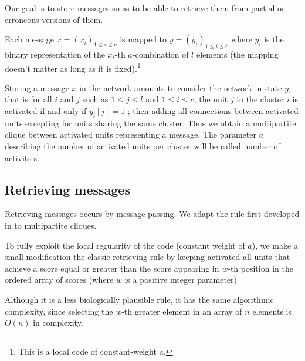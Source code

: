 \documentclass[english,11pt,twocolumn]{article}
\renewcommand{\le}{\leqslant}
\theoremstyle{definition}
\begin{document}
	Our goal is to store messages so as to be able to retrieve them from partial or erroneous versions of them.
	
	Each message $x = (x_i)_{1 \le i \le c}$ is mapped to $y = (y_i)_{1 \le i \le c}$ where $y_i$ is the binary representation of the $x_i$-th $a$-combination of $l$ elements (the mapping doesn't matter as long as it is fixed).\footnote{This is a local code of constant-weight $a$.}
	
	Storing a message $x$ in the network amounts to consider the network in state $y$, that is for all $i$ and $j$ such as $1 \le j \le l$ and $1 \le i \le c$, the unit $j$ in the cluster $i$ is activated if and only if $y_i[j] = 1$ ; then adding all connections between activated units excepting for units sharing the same cluster. Thus we obtain a multipartite clique between activated units representing a message. The parameter $a$ describing the number of activated units per cluster will be called number of activities.
		
	\subsection{Retrieving messages}	
		
		Retrieving messages occurs by message passing. We adapt the rule first developed in \cite{GriBer20117} to multipartite cliques.		
		
%		
%	
		

		To fully exploit the local regularity of the code (constant weight of $a$), we make a small modification the classic retrieving rule	by keeping activated all units that achieve a score equal or greater than the score appearing in $w$-th position in the ordered array of scores (where $w$ is a positive integer parameter)
		
		
		Although it is a less biologically plausible rule, it has the same algorithmic complexity, since selecting the $w$-th greater element in an array of $n$ elements is $O(n)$ in complexity.
		
\end{document}
